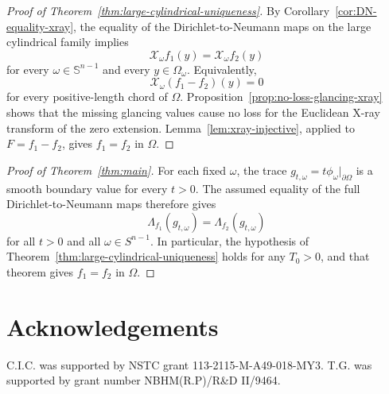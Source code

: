 \documentclass[11pt]{article}
\numberwithin{equation}{section}
\newcommand{\Sn}{\mathbb S^{n-1}}
\newcommand{\DN}{\Lambda}
\newcommand{\Xray}{\mathcal X}
\begin{document}
\begin{proof}[Proof of Theorem~\ref{thm:large-cylindrical-uniqueness}]
By Corollary~\ref{cor:DN-equality-xray}, the equality of the Dirichlet-to-Neumann maps on the large cylindrical family implies
\[
    \Xray_\omega f_1(y)=\Xray_\omega f_2(y)
\]
for every \(\omega\in\Sn\) and every \(y\in\Omega_\omega\).  Equivalently,
\[
    \Xray_\omega(f_1-f_2)(y)=0
\]
for every positive-length chord of \(\Omega\).  Proposition~\ref{prop:no-loss-glancing-xray} shows that the missing glancing values cause no loss for the Euclidean X-ray transform of the zero extension.  Lemma~\ref{lem:xray-injective}, applied to \(F=f_1-f_2\), gives \(f_1=f_2\) in \(\Omega\).
\end{proof}

\begin{proof}[Proof of Theorem~\ref{thm:main}]
For each fixed \(\omega\), the trace \(g_{t,\omega}=t\phi_\omega|_{\partial\Omega}\) is a smooth boundary value for every \(t>0\).  The assumed equality of the full Dirichlet-to-Neumann maps therefore gives
\[
    \DN_{f_1}(g_{t,\omega})=\DN_{f_2}(g_{t,\omega})
\]
for all \(t>0\) and all \(\omega\in S^{n-1}\).  In particular, the hypothesis of Theorem~\ref{thm:large-cylindrical-uniqueness} holds for any \(T_0>0\), and that theorem gives \(f_1=f_2\) in \(\Omega\).
\end{proof}

\section*{Acknowledgements}
C.I.C. was supported by NSTC grant 113-2115-M-A49-018-MY3. T.G. was supported by grant number NBHM(R.P)/R\&D II/9464.



\end{document}
